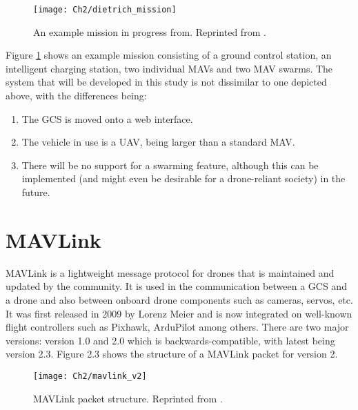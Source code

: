 \begin{figure}[t]
	\texttt{[image: Ch2/dietrich\_mission]}
	\caption[An example mission in progress from\protect{}.]{An example mission in progress from\protect{}. Reprinted from \protect{}.}
	\label{fig:dietrichmission}
\end{figure}
\FloatBarrier

Figure \ref{fig:dietrichmission} shows an example mission consisting of a ground control station, an intelligent charging station, two individual MAVs and two MAV swarms. The system that will be developed in this study is not dissimilar to one depicted above, with the differences being:

\begin{enumerate}
  \item The GCS is moved onto a web interface.
  \item The vehicle in use is a UAV, being larger than a standard MAV.
  \item There will be no support for a swarming feature, although this can be implemented (and might even be desirable for a drone-reliant society) in the future.
\end{enumerate}


\section{MAVLink}\label{sect:mavlink}
MAVLink is a lightweight message protocol for drones that is maintained and updated by the community. It is used in the communication between a GCS and a drone and also between onboard drone components such as cameras, servos, etc. It was first released in 2009 by Lorenz Meier and is now integrated on well-known flight controllers such as Pixhawk, ArduPilot among others. There are two major versions: version 1.0 and 2.0 which is backwards-compatible, with latest being version 2.3. Figure 2.3 shows the structure of a MAVLink packet for version 2.

\begin{figure}[t]
	\texttt{[image: Ch2/mavlink\_v2]}
	\caption[MAVLink packet structure.]{MAVLink packet structure. Reprinted from \protect{}.}
	\label{fig:packetstructure}
\end{figure}
\FloatBarrier


